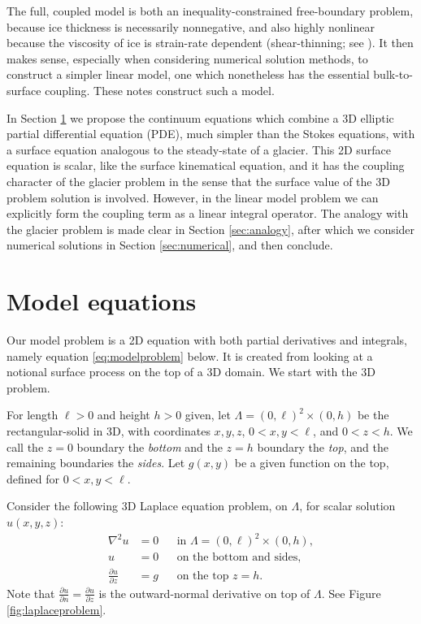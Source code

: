 \documentclass[letterpaper,final,12pt,reqno]{amsart}
\theoremstyle{cstyle}
\theoremstyle{cstyle*}
\theoremstyle{dstyle}
\newcommand{\grad}{\nabla}
\begin{document}
The full, coupled model is both an inequality-constrained free-boundary problem, because ice thickness is necessarily nonnegative, and also highly nonlinear because the viscosity of ice is strain-rate dependent (shear-thinning; see \cite{GreveBlatter2009}).  It then makes sense, especially when considering numerical solution methods, to construct a simpler linear model, one which nonetheless has the essential bulk-to-surface coupling.  These notes construct such a model.

In Section \ref{sec:model} we propose the continuum equations which combine a 3D elliptic partial differential equation (PDE), much simpler than the Stokes equations, with a surface equation analogous to the steady-state of a glacier.  This 2D surface equation is scalar, like the surface kinematical equation, and it has the coupling character of the glacier problem in the sense that the surface value of the 3D problem solution is involved.  However, in the linear model problem we can explicitly form the coupling term as a linear integral operator.  The analogy with the glacier problem is made clear in Section \ref{sec:analogy}, after which we consider numerical solutions in Section \ref{sec:numerical}, and then conclude.


\section{Model equations} \label{sec:model}

Our model problem is a 2D equation with both partial derivatives and integrals, namely equation \eqref{eq:modelproblem} below.  It is created from looking at a notional surface process on the top of a 3D domain.  We start with the 3D problem.

For length $\ell>0$ and height $h>0$ given, let $\Lambda = (0,\ell)^2\times (0,h)$ be the rectangular-solid in 3D, with coordinates $x,y,z$, $0<x,y<\ell$, and $0<z<h$.  We call the $z=0$ boundary the \emph{bottom} and the $z=h$ boundary the \emph{top}, and the remaining boundaries the \emph{sides}.  Let $g(x,y)$ be a given function on the top, defined for $0<x,y<\ell$.

Consider the following 3D Laplace equation problem, on $\Lambda$, for scalar solution $u(x,y,z)$:
\begin{subequations}
\label{eq:laplaceproblem}
\begin{align}
\grad^2 u &= 0 & &\text{in } \Lambda = (0,\ell)^2\times (0,h), \label{eq:laplaceproblemA} \\
u &= 0 & &\text{on the bottom and sides}, \label{eq:laplaceproblemB} \\
\frac{\partial u}{\partial z} &= g & &\text{on the top $z=h$}. \label{eq:laplaceproblemC}
\end{align}
\end{subequations}
Note that $\frac{\partial u}{\partial n}=\frac{\partial u}{\partial z}$ is the outward-normal derivative on top of $\Lambda$.  See Figure \ref{fig:laplaceproblem}.
\end{document}
